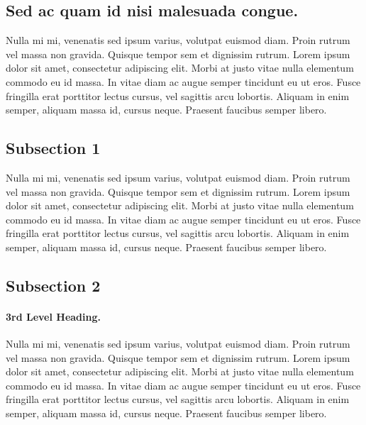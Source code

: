 \subsection*{Sed ac quam id nisi malesuada congue.}

Nulla mi mi, venenatis sed ipsum varius, volutpat euismod diam. Proin rutrum vel massa non gravida. Quisque tempor sem et dignissim rutrum. Lorem ipsum dolor sit amet, consectetur adipiscing elit. Morbi at justo vitae nulla elementum commodo eu id massa. In vitae diam ac augue semper tincidunt eu ut eros. Fusce fringilla erat porttitor lectus cursus, vel sagittis arcu lobortis. Aliquam in enim semper, aliquam massa id, cursus neque. Praesent faucibus semper libero.

\subsection*{Subsection 1}
Nulla mi mi, venenatis sed ipsum varius, volutpat euismod diam. Proin rutrum vel massa non gravida. Quisque tempor sem et dignissim rutrum. Lorem ipsum dolor sit amet, consectetur adipiscing elit. Morbi at justo vitae nulla elementum commodo eu id massa. In vitae diam ac augue semper tincidunt eu ut eros. Fusce fringilla erat porttitor lectus cursus, vel sagittis arcu lobortis. Aliquam in enim semper, aliquam massa id, cursus neque. Praesent faucibus semper libero.

\subsection*{Subsection 2}
\paragraph{3rd Level Heading.} Nulla mi mi, venenatis sed ipsum varius, volutpat euismod diam. Proin rutrum vel massa non gravida. Quisque tempor sem et dignissim rutrum. Lorem ipsum dolor sit amet, consectetur adipiscing elit. Morbi at justo vitae nulla elementum commodo eu id massa. In vitae diam ac augue semper tincidunt eu ut eros. Fusce fringilla erat porttitor lectus cursus, vel sagittis arcu lobortis. Aliquam in enim semper, aliquam massa id, cursus neque. Praesent faucibus semper libero.


